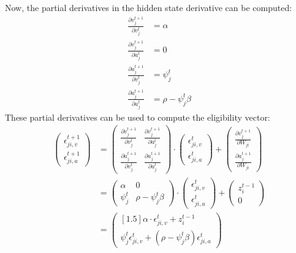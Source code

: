             Now, the partial derivatives in the hidden state derivative can be computed:
            \begin{align}
            \frac{\partial v_j^{t+1}}{\partial v_j^t} &= \alpha\\
            \frac{\partial v_j^{t+1}}{\partial a_j^t} &= 0\\
            \frac{\partial a_j^{t+1}}{\partial v_j^t} &= \psi^t_j\\
            \frac{\partial a_j^{t+1}}{\partial a_j^t} &= \rho - \psi^t_j\beta
            \end{align}
            These partial derivatives can be used to compute the eligibility vector:
            \begin{align}
            \begin{pmatrix}
            \epsilon_{ji, v}^{t+1}\\
            \epsilon_{ji, a}^{t+1}
            \end{pmatrix}
            &=
            \begin{pmatrix}
            \frac{\partial v^{t+1}_j}{\partial v^t_j} & \frac{\partial v^{t+1}_j}{\partial a^t_j}\\
            \frac{\partial a^{t+1}_j}{\partial v^t_j} & \frac{\partial a^{t+1}_j}{\partial a^t_j}
            \end{pmatrix}
            \cdot
            \begin{pmatrix}
            \epsilon_{ji, v}^t\\
            \epsilon_{ji, a}^t
            \end{pmatrix}
            +
            \begin{pmatrix}
            \frac{\partial v^{t+1}_j}{\partial W_{ji}}\\
            \frac{\partial a^{t+1}_j}{\partial W_{ji}}
            \end{pmatrix}\\
            &=
            \begin{pmatrix}
            \alpha & 0\\
            \psi^t_j & \rho-\psi^t_j\beta
            \end{pmatrix}
            \cdot
            \begin{pmatrix}
            \epsilon_{ji, v}^t\\
            \epsilon_{ji, a}^t
            \end{pmatrix}
            +
            \begin{pmatrix}
            z_i^{t-1}\\
            0
            \end{pmatrix}\label{eq:evector_b}\\
            &=
            \begin{pmatrix}[1.5]
            \alpha \cdot\epsilon_{ji, v}^t + z_i^{t-1}\\
            \psi^t_j\epsilon^t_{ji, v} + \left(\rho-\psi^t_j\beta\right)\epsilon^t_{ji, a}
            \end{pmatrix}
            \end{align}

